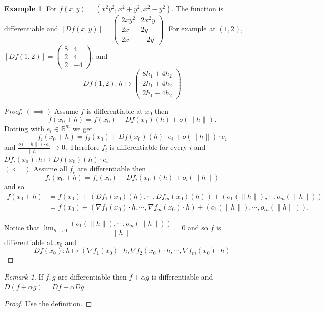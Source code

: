 \documentclass[11pt,openany]{book}
\theoremstyle{plain}
\theoremstyle{definition}
\newtheorem{example}{Example}[chapter]
\theoremstyle{remark}
\newtheorem{remark}{Remark}[chapter]
\begin{document}
\begin{example}
For $f(x,y) = (x^2y^2, x^2+y^2, x^2 - y^2).$ The function is differentiable and
$[Df(x,y)] = \begin{pmatrix}
    2xy^2 & 2x^2y\\
    2x & 2y\\
    2x & -2y
    \end{pmatrix}.$
For example at $(1,2)$, $[Df(1,2)] = \begin{pmatrix}
    8 & 4\\
    2 & 4\\
    2 & -4
    \end{pmatrix}$, and
  \[Df(1,2): h \mapsto \begin{pmatrix}
        8h_1 + 4h_2 \\
        2h_1 + 4h_2 \\
        2h_1 - 4h_2
    \end{pmatrix}\]
\end{example}

\begin{proof}
    $(\implies)$ Assume $f$ is differentiable at $x_0$ then \[f(x_0+h)= f(x_0)+Df(x_0)(h) + o( \|h\|).\] Dotting with $e_i\in \mathbb R^m$ we get \[f_i(x_0+h) = f_i(x_0)+ Df(x_0)(h)\cdot e_i+ o(\|h\|)\cdot e_i\] and $\frac{o(\|h\|)\cdot e_i}{\|h\|} \to 0.$ Therefore $f_i$ is differentiable for every $i$ and $Df_i(x_0): h \mapsto Df(x_0)(h) \cdot e_i$\\
    $(\impliedby)$ Assume all $f_i$ are differentiable then \[f_i(x_0+h) = f_i(x_0)+Df_i(x_0)(h)+ o_i(\|h\|)\] and so
    \begin{align*}
        f(x_0+h) &= f(x_0)+(Df_1(x_0)(h), \cdots, Df_m(x_0)(h))+(o_1(\|h\|), \cdots, o_m(\|h\|))\\
        &=f(x_0)+(\nabla f_1(x_0)\cdot h, \cdots, \nabla f_m(x_0)\cdot h)+(o_1(\|h\|), \cdots, o_m(\|h\|)).
    \end{align*} 

    Notice that $\lim_{h\to 0}\dfrac{(o_1(\|h\|), \cdots, o_m(\|h\|))}{\|h\|}=0$ and so $f$ is differentiable at $x_0$ and \[Df(x_0): h \mapsto  (
        \nabla f_1(x_0)\cdot  h,
        \nabla f_2(x_0)\cdot h,
        \cdots,
        \nabla f_m(x_0)\cdot h)\]
\end{proof}

\begin{remark}
    If $f,g$ are differentiable then $f+ \alpha g$ is differentiable and $D(f+ \alpha g) = Df+ \alpha Dg$
\end{remark}
\begin{proof}
     Use the definition.
\end{proof}
\end{document}
